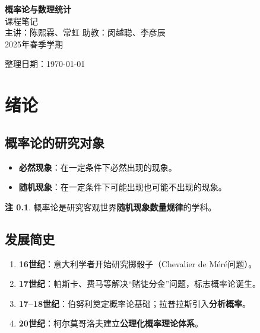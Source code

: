 \documentclass[11pt,a4paper]{report}
\theoremstyle{definition}
\newtheorem{note}{注}[chapter]
\begin{document}
\begin{titlepage}
\centering
\vspace*{3cm}
{\Huge\bfseries\color{maincolor} 概率论与数理统计}\\[0.8cm]
{\Large\color{gray} 课程笔记}\\[2cm]
{\large 主讲：陈熙霖、常虹 \quad 助教：闵越聪、李彦辰}\\[0.5cm]
{\large 2025年春季学期}\\[3cm]
\vfill
{\small 整理日期：\today}
\end{titlepage}

\tableofcontents
\newpage

\newpage
\chapter*{绪论}

\section{概率论的研究对象}
\begin{itemize}[leftmargin=2em]
    \item \textbf{必然现象}：在一定条件下必然出现的现象。
    \item \textbf{随机现象}：在一定条件下可能出现也可能不出现的现象。
\end{itemize}

\begin{note}
概率论是研究客观世界\textbf{随机现象数量规律}的学科。
\end{note}

\section{发展简史}
\begin{enumerate}[leftmargin=2em]
    \item \textbf{16世纪}：意大利学者开始研究掷骰子（Chevalier de M\'{e}r\'{e}问题）。
    \item \textbf{17世纪}：帕斯卡、费马等解决``赌徒分金''问题，标志概率论诞生。
    \item \textbf{17--18世纪}：伯努利奠定概率论基础；拉普拉斯引入\textbf{分析概率}。
    \item \textbf{20世纪}：柯尔莫哥洛夫建立\textbf{公理化概率理论体系}。
\end{enumerate}
\end{document}
